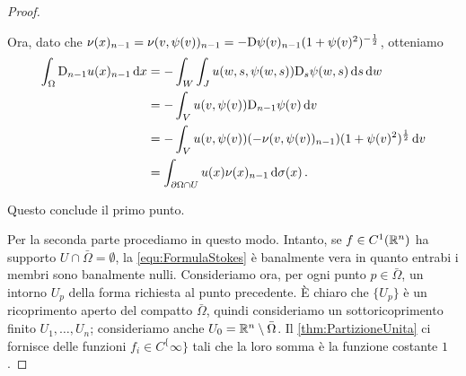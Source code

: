 \begin{proof}
\begin{description}
\[			\]
			Ora, dato che $\nu(x)_{n-1}=\nu(v,\psi(v))_{n-1}=-\mathrm D\psi(v)_{n-1}(1+\psi(v)^2)^{-\frac{1}{2}}$, otteniamo
			\begin{align*}
				\int_{\Omega} \mathrm D_{n-1} u(x)_{n-1} \,\mathrm d x & = -\int_W \int_J u(w,s,\psi(w,s))\mathrm D_s \psi (w,s) \,\mathrm d s \,\mathrm d w\\
				& = -\int_V u(v,\psi(v))\mathrm D_{n-1} \psi(v) \,\mathrm d v\\
				& = -\int_V u(v,\psi(v))(-\nu(v,\psi(v))_{n-1})(1+\psi(v)^2)^{\frac{1}{2}} \,\mathrm d v\\
				& = \int_{\partial \Omega \cap U} u(x)\nu(x)_{n-1} \,\mathrm d \sigma(x)\, \text{. }
			\end{align*}
	\end{description}
	Questo conclude il primo punto.
	
	Per la seconda parte procediamo in questo modo. Intanto, se $f\in C^1(\mathbb R^n)$ ha supporto $U\cap \bar\Omega = \emptyset$, la
	\cref{equ:FormulaStokes} è banalmente vera in quanto entrabi i membri sono banalmente nulli.
	Consideriamo ora, per ogni punto $p\in \bar\Omega$, un intorno $U_p$ della forma richiesta al punto precedente. È chiaro che $\{U_p\}$ è un
	ricoprimento aperto del compatto $\bar \Omega$, quindi consideriamo un sottoricoprimento finito $U_1,\dots,U_n$; consideriamo anche
	$U_0=\mathbb R^n \setminus \bar\Omega$. Il \cref{thm:PartizioneUnita} ci fornisce delle funzioni $f_i\in C^\{\infty\}$ tali che la loro somma è
	la funzione costante $1$.
\end{proof}

